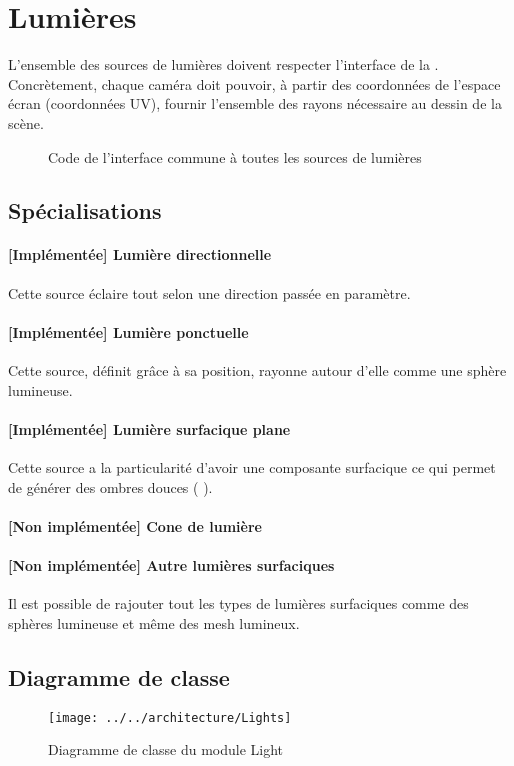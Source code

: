 \section{Lumières}
L'ensemble des sources de lumières doivent respecter l'interface de la . Concrètement, chaque caméra doit pouvoir, à partir des
coordonnées de l'espace écran (coordonnées UV), fournir l'ensemble des rayons
nécessaire au dessin de la scène.

\begin{figure}[h]
  \caption{Code de l'interface commune à toutes les
  sources de lumières\label{fig:ILights}}
\end{figure}

\subsection{Spécialisations}
\paragraph{[Implémentée] Lumière directionnelle} Cette source éclaire tout selon une
direction passée en paramètre.

\paragraph{[Implémentée] Lumière ponctuelle} Cette source, définit grâce à sa position,
rayonne autour d'elle comme une sphère lumineuse.

\paragraph{[Implémentée] Lumière surfacique plane} Cette source a la particularité d'avoir une
composante surfacique ce qui permet de générer des ombres douces (\cf
{}).

\paragraph{[Non implémentée] Cone de lumière}

\paragraph{[Non implémentée] Autre lumières surfaciques} Il est possible de
rajouter tout les types de lumières surfaciques comme des sphères lumineuse et
même des mesh lumineux. 

\subsection{Diagramme de classe}
\begin{figure}[h]
\begin{center}
  \texttt{[image: ../../architecture/Lights]}
  \caption{Diagramme de classe du module Light\label{fig:CDLights}}
\end{center}
\end{figure}
